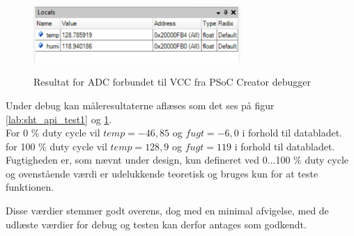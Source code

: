 \begin{figure}[htb]
\centering
{\includegraphics[width=0.70\textwidth]{filer/modultest/Billeder/psoc_api_test2}}
\caption{Resultat for ADC forbundet til VCC fra PSoC Creator debugger}
\label{lab:sht_api_test2}
\end{figure}

Under debug kan måleresultaterne aflæses som det ses på figur \ref{lab:sht_api_test1} og \ref{lab:sht_api_test2}. \\
For 0 \% duty cycle vil $temp = -46,85$ og $fugt = -6,0$ i forhold til databladet. \\
for 100 \% duty cycle vil $temp = 128,9$ og $fugt = 119$ i forhold til databladet. \\
Fugtigheden er, som nævnt under design, kun defineret ved 0...100 \% duty cycle og ovenstående værdi er udelukkende teoretisk og bruges kun for at teste funktionen. 

Disse værdier stemmer godt overens, dog med en minimal afvigelse, med de udlæste værdier for debug og testen kan derfor antages som godkendt.